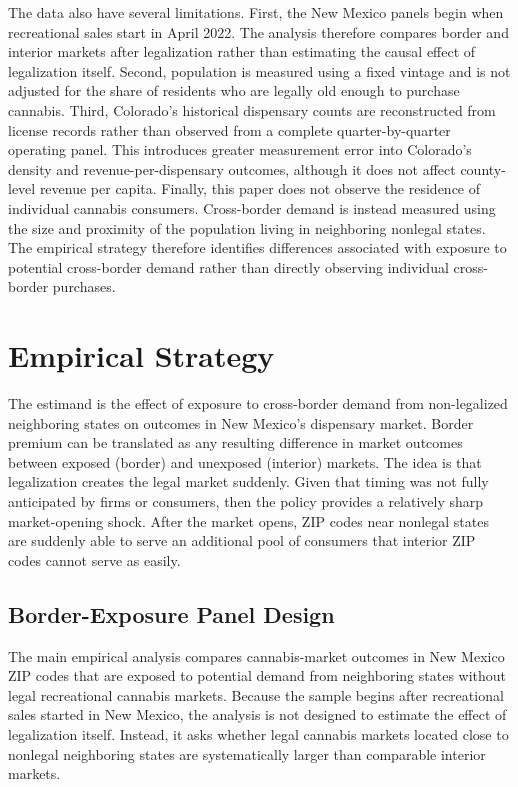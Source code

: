 \documentclass[12pt]{article}
\begin{document}


The data also have several limitations. First, the New Mexico panels begin when recreational sales start in April 2022. The analysis therefore compares border and interior markets after legalization rather than estimating the causal effect of legalization itself. Second, population is measured using a fixed vintage and is not adjusted for the share of residents who are legally old enough to purchase cannabis. Third, Colorado's historical dispensary counts are reconstructed from license records rather than observed from a complete quarter-by-quarter operating panel. This introduces greater measurement error into Colorado's density and revenue-per-dispensary outcomes, although it does not affect county-level revenue per capita. Finally, this paper does not observe the residence of individual cannabis consumers. Cross-border demand is instead measured using the size and proximity of the population living in neighboring nonlegal states. The empirical strategy therefore identifies differences associated with exposure to potential cross-border demand rather than directly observing individual cross-border purchases.

\section{Empirical Strategy}
\label{sec:empirical}

The estimand is the effect of exposure to
cross-border demand from non-legalized neighboring states on outcomes in
New Mexico's dispensary market. Border premium can be translated as any
resulting difference in market outcomes between exposed (border) and unexposed (interior) markets. The idea is that legalization creates the legal market suddenly. Given that timing was not fully anticipated by firms or consumers, then the policy provides a relatively sharp market-opening shock. After the market opens, ZIP codes near nonlegal states are suddenly able to serve an additional pool of consumers that interior ZIP codes cannot serve as easily.

\subsection{Border-Exposure Panel Design}
\label{sec:borderexposure}

The main empirical analysis compares cannabis-market outcomes in New Mexico ZIP codes that are exposed to potential demand from neighboring states without legal recreational cannabis markets. Because the sample begins after recreational sales started in New Mexico, the analysis is not designed to estimate the effect of legalization itself. Instead, it asks whether legal cannabis markets located close to nonlegal neighboring states are systematically larger than comparable interior markets.
\end{document}
